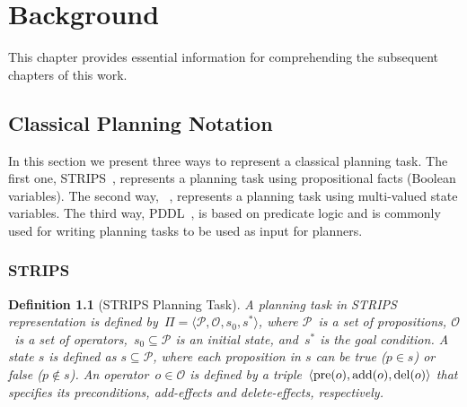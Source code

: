 \documentclass[ppgc,diss,english]{iiufrgs}
\newtheorem{definition}{Definition}
\begin{document}
\chapter{Background}
\label{cha:background}
This chapter provides essential information for comprehending the subsequent chapters of this work.

\section{Classical Planning Notation}
\label{sec:background-planning-notation}
In this section we present three ways to represent a classical planning task. The first one, STRIPS~\cite{Fikes.Nilsson/1971}, represents a planning task using propositional facts (Boolean variables). The second way, \sas~\cite{Backstrom.Nebel/1995}, represents a planning task using multi-valued state variables. The third way, PDDL~\cite{Ghallab.etal/1998}, is based on predicate logic and is commonly used for writing planning tasks to be used as input for planners.

\subsection{STRIPS}
\label{sec:background-strips}
\begin{definition}[STRIPS Planning Task]\label{def:strips}
A planning task in STRIPS representation is defined by~$\Pi=\langle\mathcal{P},\mathcal{O},s_{0},s^{*}\rangle$, where $\mathcal{P}$~is a set of propositions, $\mathcal{O}$~is a set of operators,~$s_{0} \subseteq \mathcal{P}$ is an initial state, and~$s^{*}$ is the goal condition.
A state $s$ is defined as $s \subseteq \mathcal{P}$, where each proposition in $s$ can be true ($p \in s$) or false ($p \notin s$). %
An operator~$o \in \mathcal{O}$ is defined by a triple~$\langle\operatorname{pre}(o),\operatorname{add}(o),\operatorname{del}(o)\rangle$ that specifies its preconditions, add-effects and delete-effects, respectively.
\end{definition}
\end{document}
